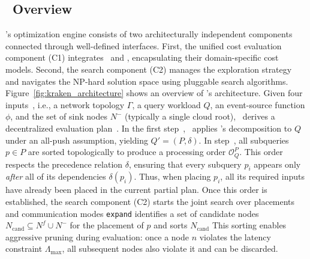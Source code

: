\subsection{\we~Overview}\label{sec:overviewKraken}
 \we's optimization engine consists of two architecturally independent components connected through well-defined interfaces. First, the unified cost evaluation component (C1) integrates \inev~and \prepp, encapsulating their domain-specific cost models.
%
Second, the search component (C2) manages the exploration strategy and navigates the NP-hard solution space using pluggable search algorithms.
Figure~\ref{fig:kraken_architecture} shows an overview of \we's architecture.
%
Given four inputs~, i.e., a network topology $\Gamma$, a query
workload $Q$, an event-source function $\phi$, and the set of sink nodes
$N^-$ (typically a single cloud root), \we~derives a decentralized
evaluation plan~.
%
In the first step~, \we~applies \inev's decomposition to $Q$ under an all-push assumption,
yielding $Q' = (P, \delta)$.
%
In step~, all subqueries $p \in P$ are sorted topologically to produce a processing order $\mathcal{O}^P_Q$.
%
This order respects the precedence relation $\delta$, ensuring that every subquery $p_i$ appears only \emph{after} all of its dependencies $\delta(p_i)$. Thus, when placing $p_i$, all its required inputs have already been placed in the current partial plan.
%
Once this order is established, the search component (C2) starts the joint search over placements and communication modes \texttt{expand} identifies a set of candidate nodes $N_{\text{cand}} \subseteq N^f \cup N^-$ for the placement of $p$ and sorts $N_{\text{cand}}$ 
%
This sorting  enables aggressive pruning during evaluation: once a node $n$ violates the latency constraint $\Lambda_{\text{max}}$, all subsequent nodes also violate it and can be discarded.
%
